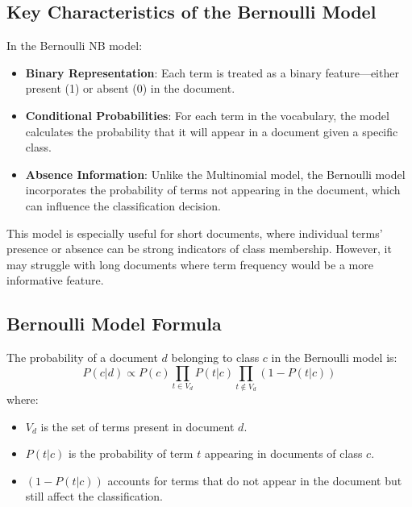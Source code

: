 \documentclass{article}
\begin{document}
\subsection*{Key Characteristics of the Bernoulli Model}
In the Bernoulli NB model:
\begin{itemize}
    \item \textbf{Binary Representation}: Each term is treated as a binary feature—either present (1) or absent (0) in the document.
    \item \textbf{Conditional Probabilities}: For each term in the vocabulary, the model calculates the probability that it will appear in a document given a specific class.
    \item \textbf{Absence Information}: Unlike the Multinomial model, the Bernoulli model incorporates the probability of terms not appearing in the document, which can influence the classification decision.
\end{itemize}

This model is especially useful for short documents, where individual terms’ presence or absence can be strong indicators of class membership. However, it may struggle with long documents where term frequency would be a more informative feature.

\subsection*{Bernoulli Model Formula}
The probability of a document \( d \) belonging to class \( c \) in the Bernoulli model is:
\[
P(c|d) \propto P(c) \prod_{t \in V_d} P(t|c) \prod_{t \notin V_d} (1 - P(t|c))
\]
where:
\begin{itemize}
    \item \( V_d \) is the set of terms present in document \( d \).
    \item \( P(t|c) \) is the probability of term \( t \) appearing in documents of class \( c \).
    \item \( (1 - P(t|c)) \) accounts for terms that do not appear in the document but still affect the classification.
\end{itemize}
\end{document}
